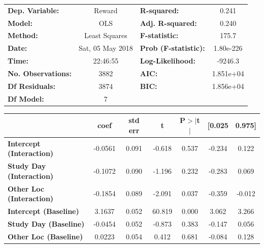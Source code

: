 \begin{table}
\begin{tabular}{lclc}
\toprule
\textbf{Dep. Variable:}                &      Reward       & \textbf{  R-squared:         } &     0.241   \\
\textbf{Model:}                        &       OLS        & \textbf{  Adj. R-squared:    } &     0.240   \\
\textbf{Method:}                       &  Least Squares   & \textbf{  F-statistic:       } &     175.7   \\
\textbf{Date:}                         & Sat, 05 May 2018 & \textbf{  Prob (F-statistic):} & 1.80e-226   \\
\textbf{Time:}                         &     22:46:55     & \textbf{  Log-Likelihood:    } &   -9246.3   \\
\textbf{No. Observations:}             &        3882      & \textbf{  AIC:               } & 1.851e+04   \\
\textbf{Df Residuals:}                 &        3874      & \textbf{  BIC:               } & 1.856e+04   \\
\textbf{Df Model:}                     &           7      & \textbf{                     } &             \\
\bottomrule
\end{tabular}
\begin{tabular}{lcccccc}
                                       & \textbf{coef} & \textbf{std err} & \textbf{t} & \textbf{P$>$$|$t$|$} & \textbf{[0.025} & \textbf{0.975]}  \\
\midrule
\textbf{Intercept (Interaction)}       &      -0.0561  &        0.091     &    -0.618  &         0.537        &       -0.234    &        0.122     \\
\textbf{Study Day (Interaction)}       &      -0.1072  &        0.090     &    -1.196  &         0.232        &       -0.283    &        0.069     \\
\textbf{Other Loc (Interaction)}       &      -0.1854  &        0.089     &    -2.091  &         0.037        &       -0.359    &       -0.012     \\
\textbf{Intercept (Baseline)}          &       3.1637  &        0.052     &    60.819  &         0.000        &        3.062    &        3.266     \\
\textbf{Study Day (Baseline)}          &      -0.0454  &        0.052     &    -0.873  &         0.383        &       -0.147    &        0.056     \\
\textbf{Other Loc (Baseline)}          &       0.0223  &        0.054     &     0.412  &         0.681        &       -0.084    &        0.128     \\

\end{tabular}
\end{table}
